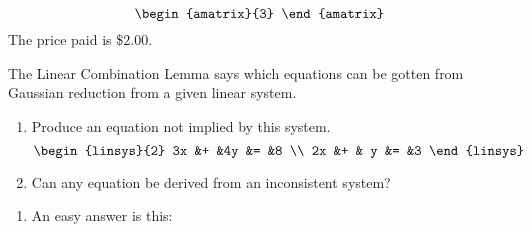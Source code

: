 \begin{exercises}
\begin{answer}
\begin{equation*}
\begin{amatrix}{3}
       \end{amatrix}
     \end{equation*}
     The price paid is \$$2.00$.
   \end{answer}
  \recommended \item 
   The Linear Combination Lemma says which equations can be gotten from
   Gaussian reduction from a given linear system.
   \begin{enumerate}
     \item Produce an equation not implied by this system.
       \begin{equation*}
         \begin{linsys}{2}
           3x  &+  &4y  &=  &8 \\
           2x  &+  & y  &=  &3 
         \end{linsys}
       \end{equation*}
     \item Can any equation be derived from an inconsistent system?
   \end{enumerate}
   \begin{answer}
     \begin{enumerate}
        \item An easy answer is this:

\end{enumerate}
\end{answer}
\end{exercises}
